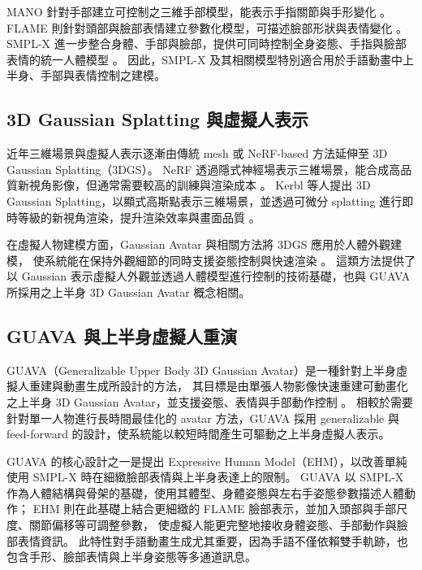 \documentclass[class=NCU_thesis, crop=false]{standalone}
\begin{document}
MANO 針對手部建立可控制之三維手部模型，能表示手指關節與手形變化 \cite{MANO:2017}。
FLAME 則針對頭部與臉部表情建立參數化模型，可描述臉部形狀與表情變化 \cite{FLAME:2017}。
SMPL-X 進一步整合身體、手部與臉部，提供可同時控制全身姿態、手指與臉部表情的統一人體模型 \cite{SMPL-X:2019}。
因此，SMPL-X 及其相關模型特別適合用於手語動畫中上半身、手部與表情控制之建模。

\subsection{3D Gaussian Splatting 與虛擬人表示}
\label{subsec:3dgs_avatar}

近年三維場景與虛擬人表示逐漸由傳統 mesh 或 NeRF-based 方法延伸至 3D Gaussian Splatting（3DGS）。
NeRF 透過隱式神經場表示三維場景，能合成高品質新視角影像，但通常需要較高的訓練與渲染成本 \cite{mildenhall2020nerf}。
Kerbl 等人提出 3D Gaussian Splatting，以顯式高斯點表示三維場景，並透過可微分 splatting 進行即時等級的新視角渲染，提升渲染效率與畫面品質 \cite{kerbl3Dgaussians}。

在虛擬人物建模方面，Gaussian Avatar 與相關方法將 3DGS 應用於人體外觀建模，
使系統能在保持外觀細節的同時支援姿態控制與快速渲染 \cite{hu2024gaussianavatar,moon2024exavatar}。
這類方法提供了以 Gaussian 表示虛擬人外觀並透過人體模型進行控制的技術基礎，也與 GUAVA 所採用之上半身 3D Gaussian Avatar 概念相關。

\subsection{GUAVA 與上半身虛擬人重演}
\label{subsec:guava}

GUAVA（Generalizable Upper Body 3D Gaussian Avatar）是一種針對上半身虛擬人重建與動畫生成所設計的方法，
其目標是由單張人物影像快速重建可動畫化之上半身 3D Gaussian Avatar，並支援姿態、表情與手部動作控制 \cite{zhang2025guava}。
相較於需要針對單一人物進行長時間最佳化的 avatar 方法，GUAVA 採用 generalizable 與 feed-forward 的設計，使系統能以較短時間產生可驅動之上半身虛擬人表示。

GUAVA 的核心設計之一是提出 Expressive Human Model（EHM），以改善單純使用 SMPL-X 時在細緻臉部表情與上半身表達上的限制。
GUAVA 以 SMPL-X 作為人體結構與骨架的基礎，使用其體型、身體姿態與左右手姿態參數描述人體動作；
EHM 則在此基礎上結合更細緻的 FLAME 臉部表示，並加入頭部與手部尺度、關節偏移等可調整參數，
使虛擬人能更完整地接收身體姿態、手部動作與臉部表情資訊。
此特性對手語動畫生成尤其重要，因為手語不僅依賴雙手軌跡，也包含手形、臉部表情與上半身姿態等多通道訊息。
\end{document}
